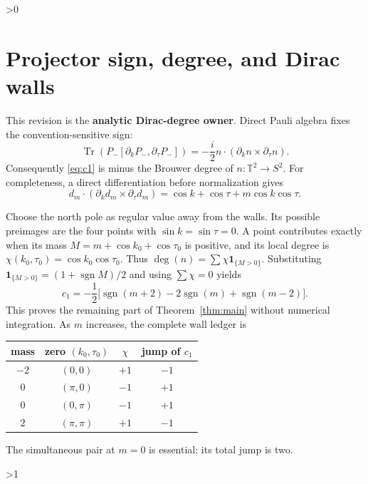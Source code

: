 \documentclass[10pt]{article}
\providecommand{\CRevisionRound}{2}
\newcommand{\Tr}{\operatorname{Tr}}
\newcommand{\T}{\mathbb T}
\begin{document}
\ifnum\CRevisionRound>0
\section{Projector sign, degree, and Dirac walls}
This revision is the \textbf{analytic Dirac-degree owner}.  Direct Pauli
algebra fixes the convention-sensitive sign:
\begin{equation}\label{eq:pauli}
 \Tr\!\left(P_-[\partial_kP_-,\partial_\tau P_-]\right)
 =-\frac{i}{2}n\cdot(\partial_kn\times\partial_\tau n).
\end{equation}
Consequently \eqref{eq:c1} is minus the Brouwer degree of $n:\T^2\to S^2$.
For completeness, a direct differentiation before normalization gives
\begin{equation}\label{eq:numerator}
d_m\cdot(\partial_kd_m\times\partial_\tau d_m)
=\cos k+\cos\tau+m\cos k\cos\tau.
\end{equation}

Choose the north pole as regular value away from the walls.  Its possible
preimages are the four points with $\sin k=\sin\tau=0$.  A point contributes
exactly when its mass $M=m+\cos k_0+\cos\tau_0$ is positive, and its local
degree is $\chi(k_0,\tau_0)=\cos k_0\cos\tau_0$.  Thus
$\deg(n)=\sum\chi\mathbf1_{\{M>0\}}$.  Substituting
$\mathbf1_{\{M>0\}}=(1+\operatorname{sgn}M)/2$ and using
$\sum\chi=0$ yields
\begin{equation}\label{eq:masssum}
c_1=-\frac12\bigl[\operatorname{sgn}(m+2)
-2\operatorname{sgn}(m)+\operatorname{sgn}(m-2)\bigr].
\end{equation}
This proves the remaining part of Theorem~\ref{thm:main} without numerical
integration.  As $m$ increases, the complete wall ledger is
\begin{center}
\begin{tabular}{cccc}
\toprule
mass & zero $(k_0,\tau_0)$ & $\chi$ & jump of $c_1$\\
\midrule
$-2$ & $(0,0)$ & $+1$ & $-1$\\
$0$ & $(\pi,0)$ & $-1$ & $+1$\\
$0$ & $(0,\pi)$ & $-1$ & $+1$\\
$2$ & $(\pi,\pi)$ & $+1$ & $-1$\\
\bottomrule
\end{tabular}
\end{center}
The simultaneous pair at $m=0$ is essential: its total jump is two.
\fi

\ifnum\CRevisionRound>1
\end{document}
